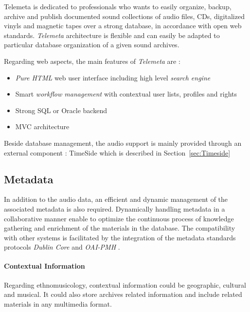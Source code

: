 \documentclass[runningheads,a4paper]{llncs}
\begin{document}
Telemeta is dedicated to professionals who wants to easily organize, backup, archive and publish documented sound collections of audio files, CDs, digitalized vinyls and magnetic tapes over a strong database, in accordance with open web standards. 
\emph{Telemeta} architecture is flexible and can easily be adapted to particular database organization of a given sound archives. 

Regarding web aspects, the main features of \emph{Telemeta} are :
\vspace{-0.1cm}
\begin{itemize}
\item \emph{Pure HTML} web user interface including high level \emph{search engine}
\item Smart \emph{workflow management} with contextual user lists, profiles and rights
\item Strong SQL or Oracle backend
\item MVC architecture 
\end{itemize}
Beside database management, the audio support is mainly provided through an external component : TimeSide which is described in Section~\ref{sec:Timeside}

\subsection{Metadata}\label{sec:metadata}
In addition to the audio data, an efficient and dynamic management of the associated metadata is also required. %
Dynamically handling metadata in a collaborative manner enable to optimize the continuous process of knowledge gathering and enrichment of the materials in the database.  
The compatibility with other systems is facilitated by the integration of the metadata standards protocols \emph{Dublin Core} and \emph{OAI-PMH} \cite{DublinCore,OAI-PMH}.

\paragraph{Contextual Information}
Regarding ethnomusicology, contextual information could be geographic, cultural and musical. It could also store archives related information and include related materials in any multimedia format.  
\end{document}
